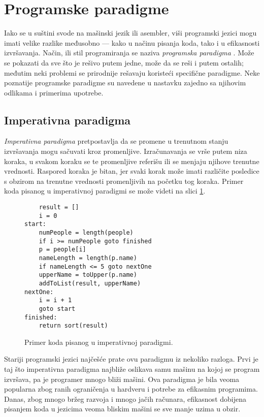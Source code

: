 \section{Programske paradigme}
\label{sec:Paradigms}

Iako se u suštini svode na mašinski jezik ili asembler, viši programski jezici mogu imati velike razlike međusobno --- kako u načinu pisanja koda, tako i u efikasnosti izvršavanja. Način, ili stil programiranja se naziva \emph{programska paradigma} \cite{ProgrammingParadigms}. Može se pokazati da sve što je rešivo putem jedne, može da se reši i putem ostalih; međutim neki problemi se prirodnije rešavaju koristeći specifične paradigme. Neke poznatije programske paradigme su navedene u nastavku zajedno sa njihovim odlikama i primerima upotrebe.


\subsection{Imperativna paradigma}
\label{subsec:ParadigmImperative}

\emph{Imperativna paradigma} pretpostavlja da se promene u trenutnom stanju izvršavanja mogu sačuvati kroz promenljive. Izračunavanja se vrše putem niza koraka, u svakom koraku se te promenljive referišu ili se menjaju njihove trenutne vrednosti. Raspored koraka je bitan, jer svaki korak može imati različite posledice s obzirom na trenutne vrednosti promenljivih na početku tog koraka. Primer koda pisanog u imperativnoj paradigmi se može videti na slici \ref{fig:ParadigmImperative}.

\begin{figure}[h!]
\begin{lstlisting}
    result = []
    i = 0
start:
    numPeople = length(people)
    if i >= numPeople goto finished
    p = people[i]
    nameLength = length(p.name)
    if nameLength <= 5 goto nextOne
    upperName = toUpper(p.name)
    addToList(result, upperName)
nextOne:
    i = i + 1
    goto start
finished:
    return sort(result)
\end{lstlisting}
\caption{Primer koda pisanog u imperativnoj paradigmi.}
\label{fig:ParadigmImperative}
\end{figure}

Stariji programski jezici najčešće prate ovu paradigmu iz nekoliko razloga. Prvi je taj što imperativna paradigma najbliže oslikava samu mašinu na kojoj se program izvršava, pa je programer mnogo bliži mašini. Ova paradigma je bila veoma popularna zbog ranih ograničenja u hardveru i potrebe za efikasnim programima. Danas, zbog mnogo bržeg razvoja i mnogo jačih računara, efikasnost dobijena pisanjem koda u jezicima veoma bliskim mašini se sve manje uzima u obzir.

